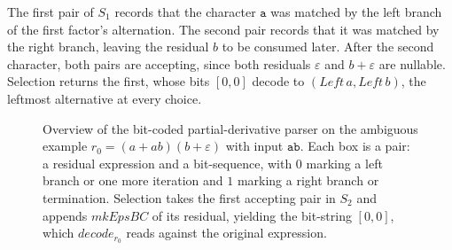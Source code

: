 The first pair of $S_1$ records that the character $\mathtt{a}$ 
was matched by the left branch of the first factor's alternation. 
The second pair records that it was matched by the right branch, 
leaving the residual $b$ to be consumed later. 
After the second character, both pairs are accepting, 
since both residuals $\varepsilon$ and $b + \varepsilon$ are nullable. 
Selection returns the first, 
whose bits $[0, 0]$ 
decode to $(\mathit{Left}\,a, \mathit{Left}\,b)$, 
the leftmost alternative at every choice. 
\begin{figure}[ht]
\centering
{}
\caption{Overview of the bit-coded partial-derivative parser on the ambiguous
example $r_0 = (a + ab)(b + \varepsilon)$ with input $\mathtt{ab}$. 
Each box is a pair: a residual expression and a bit-sequence, with $0$
marking a left branch or one more iteration and $1$ marking a right
branch or termination. Selection takes the
first accepting pair in $S_2$ and appends $\mathit{mkEpsBC}$ of its
residual, yielding the bit-string $[0,0]$, which
$\mathit{decode}_{r_0}$ reads against the original expression.}
\label{fig:pderiv-bc-overview}
\end{figure}

